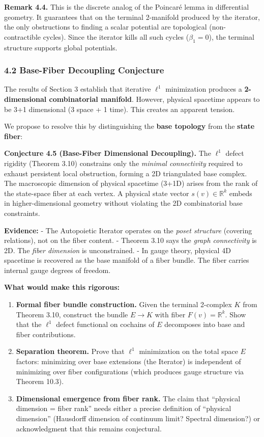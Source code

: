 \documentclass[
]{article}
\begin{document}
\textbf{Remark 4.4.} This is the discrete analog of the Poincaré lemma
in differential geometry. It guarantees that on the terminal 2-manifold
produced by the iterator, the only obstructions to finding a scalar
potential are topological (non-contractible cycles). Since the iterator
kills all such cycles (\(\beta_1 = 0\)), the terminal structure supports
global potentials.

\subsubsection{4.2 Base-Fiber Decoupling
Conjecture}\label{base-fiber-decoupling-conjecture}

The results of Section 3 establish that iterative \(\ell^1\)
minimization produces a \textbf{2-dimensional combinatorial manifold}.
However, physical spacetime appears to be 3+1 dimensional (3 space + 1
time). This creates an apparent tension.

We propose to resolve this by distinguishing the \textbf{base topology}
from the \textbf{state fiber}:

\textbf{Conjecture 4.5 (Base-Fiber Dimensional Decoupling).} The
\(\ell^1\) defect rigidity (Theorem 3.10) constrains only the
\emph{minimal connectivity} required to exhaust persistent local
obstruction, forming a 2D triangulated base complex. The macroscopic
dimension of physical spacetime (3+1D) arises from the rank of the
state-space fiber at each vertex. A physical state vector
\(s(v) \in \mathbb{R}^k\) embeds in higher-dimensional geometry without
violating the 2D combinatorial base constraints.

\textbf{Evidence:} - The Autopoietic Iterator operates on the
\emph{poset structure} (covering relations), not on the fiber content. -
Theorem 3.10 says the \emph{graph connectivity} is 2D. The \emph{fiber
dimension} is unconstrained. - In gauge theory, physical 4D spacetime is
recovered as the base manifold of a fiber bundle. The fiber carries
internal gauge degrees of freedom.

\textbf{What would make this rigorous:}

\begin{enumerate}
\def\labelenumi{\arabic{enumi}.}
\item
  \textbf{Formal fiber bundle construction.} Given the terminal
  2-complex \(K\) from Theorem 3.10, construct the bundle \(E \to K\)
  with fiber \(F(v) = \mathbb{R}^k\). Show that the \(\ell^1\) defect
  functional on cochains of \(E\) decomposes into base and fiber
  contributions.
\item
  \textbf{Separation theorem.} Prove that \(\ell^1\) minimization on the
  total space \(E\) factors: minimizing over base extensions (the
  Iterator) is independent of minimizing over fiber configurations
  (which produces gauge structure via Theorem 10.3).
\item
  \textbf{Dimensional emergence from fiber rank.} The claim that
  ``physical dimension = fiber rank'' needs either a precise definition
  of ``physical dimension'' (Hausdorff dimension of continuum limit?
  Spectral dimension?) or acknowledgment that this remains conjectural.
\end{enumerate}
\end{document}
